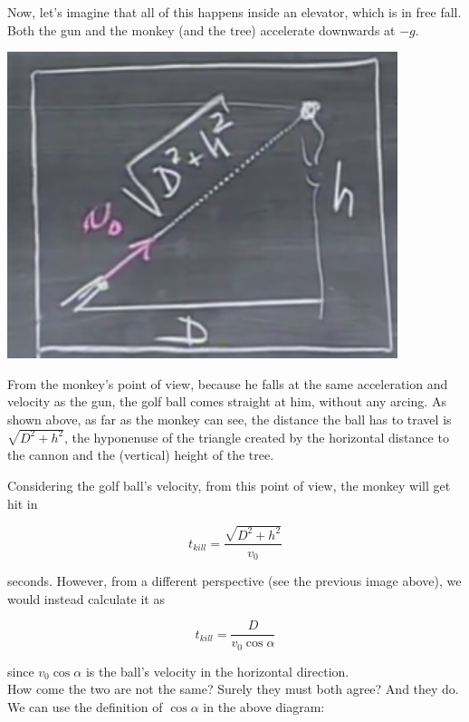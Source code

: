 \documentclass[12pt,a4paper]{report}
\begin{document}
Now, let's imagine that all of this happens inside an elevator, which is in free fall. Both the gun and the monkey (and the tree) accelerate downwards at $-g$.

\begin{center}
\includegraphics[scale=0.6]{Graphics/lec4_elevator}
\end{center}

From the monkey's point of view, because he falls at the same acceleration and velocity as the gun, the golf ball comes straight at him, without any arcing. As shown above, as far as the monkey can see, the distance the ball has to travel is $\sqrt{D^2 + h^2}$, the hyponenuse of the triangle created by the horizontal distance to the cannon and the (vertical) height of the tree.

Considering the golf ball's velocity, from this point of view, the monkey will get hit in

\begin{equation}
t_{kill} = \frac{\sqrt{D^2 + h^2}}{v_0}
\end{equation}

seconds. However, from a different perspective (see the previous image above), we would instead calculate it as

\begin{equation}
t_{kill} = \frac{D}{v_0 \cos \alpha}
\end{equation}

since $v_0 \cos \alpha$ is the ball's velocity in the horizontal direction.\\
How come the two are not the same? Surely they must both agree? And they do. We can use the definition of $\cos \alpha$ in the above diagram:
\end{document}
